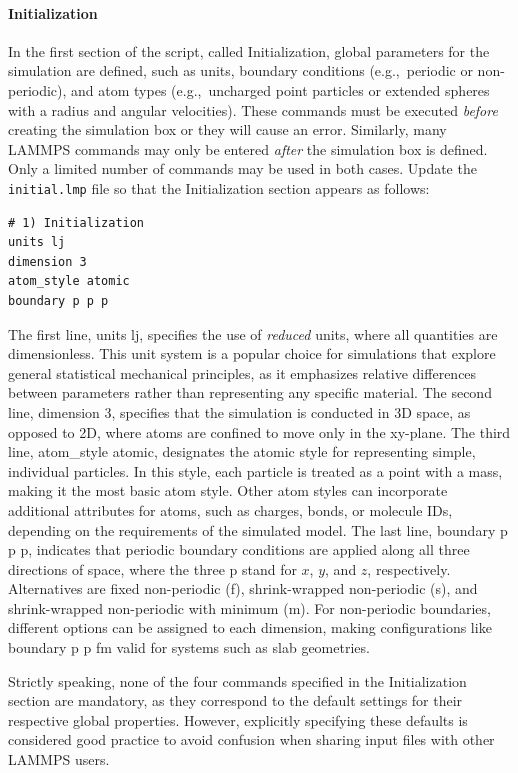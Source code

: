 \documentclass[9pt,tutorial]{livecoms}
\newcommand{\lmpcmd}[1]{\hspace{0pt}\colorbox{listing}{\textcolor{command}{\small{#1}}}\hspace{0pt}} %
\newcommand{\flecmd}[1]{\textcolor{command}{\texttt{#1}}} %
\begin{document}
\paragraph{Initialization}

In the first section of the script, called \lmpcmd{Initialization},
global parameters for the simulation are defined, such as units, boundary conditions
(e.g.,~periodic or non-periodic), and atom types (e.g.,~uncharged point particles
or extended spheres with a radius and angular velocities).  These commands must be
executed \emph{before} creating the simulation box or they will cause
an error.  Similarly, many LAMMPS commands may only be
entered \emph{after} the simulation box is defined.  Only a limited
number of commands may be used in both cases.  Update the \flecmd{initial.lmp} file
so that the \lmpcmd{Initialization} section appears as follows:
\begin{lstlisting}
# 1) Initialization
units lj
dimension 3
atom_style atomic
boundary p p p
\end{lstlisting}
The first line, \lmpcmd{units lj}, specifies the use of
\emph{reduced} units, where all quantities are dimensionless.  This unit system is
a popular choice for simulations that explore general statistical mechanical
principles, as it emphasizes relative differences between parameters rather than
representing any specific material.  The second line, \lmpcmd{dimension 3}, specifies that the simulation is conducted
in 3D space, as opposed to 2D, where atoms are confined to move only in the 
xy-plane.  The third line, \lmpcmd{atom\_style atomic}, designates
the atomic style for representing simple, individual particles.
In this style, each particle is treated as a point with a mass, making it the
most basic atom style.  Other atom styles can incorporate additional attributes for atoms,
such as charges, bonds, or molecule IDs, depending on the requirements of the simulated model.
The last line, \lmpcmd{boundary p p p}, indicates that periodic boundary
conditions are applied along all three directions of space, where the three
p stand for $x$, $y$, and $z$, respectively.  Alternatives are fixed non-periodic
(f), shrink-wrapped non-periodic (s), and shrink-wrapped non-periodic
with minimum (m).  For non-periodic boundaries, different options
can be assigned to each dimension, making configurations like \lmpcmd{boundary p p fm}
valid for systems such as slab geometries.

\begin{note}
Strictly speaking, none of the four commands specified in the
Initialization section are mandatory, as
they correspond to the default settings for their respective global properties.
However, explicitly specifying these defaults is considered good practice
to avoid confusion when sharing input files with other LAMMPS users.
\end{note}
\end{document}
